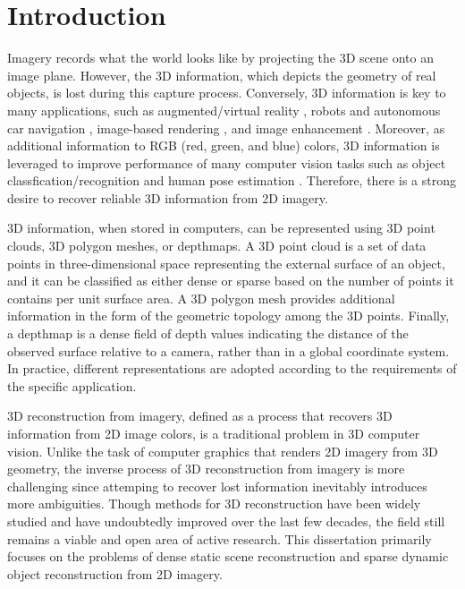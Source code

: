 

\chapter{Introduction}

Imagery records what the world looks like by projecting the 3D scene onto an image plane. However, the 3D information, which depicts the geometry of real objects, is lost during this capture process. Conversely,   3D information is key to many applications, such as augmented/virtual reality \cite{ventura2008depth}, robots and autonomous car navigation \cite{endres2012evaluation}, image-based rendering \cite{View_interpolation1993}, and image enhancement \cite{zhang2014personal}. Moreover, as additional information to RGB (red, green, and blue) colors, 3D information is leveraged to improve performance of many computer vision tasks such as object classfication/recognition \cite{gupta2013perceptual}  and human pose estimation \cite{CVPR_kinect}. Therefore, there is a strong desire to recover reliable 3D information from 2D imagery.

3D information, when stored in computers, can be represented using 3D point clouds, 3D polygon meshes, or depthmaps. A 3D point cloud is a set of data points in three-dimensional space representing the external surface of an object, and it can be classified as either dense or sparse based on the number of points it contains per unit surface area. A 3D polygon mesh provides additional information in the form of the geometric topology among the 3D points. Finally, a depthmap is a dense field of depth values indicating the distance of the observed surface relative to a camera, rather than in a global coordinate system. In practice, different representations are adopted according to the requirements of the specific application. 

3D reconstruction from imagery, defined as a process that recovers 3D information from 2D image colors, is a traditional problem in 3D computer vision. Unlike the task of computer graphics that renders 2D imagery from 3D geometry, the inverse process of 3D reconstruction from imagery is more challenging since attemping to recover lost information inevitably introduces more ambiguities. Though methods for 3D reconstruction have been widely studied and have undoubtedly improved over the last few decades, the field still remains a viable and open area of active research. This dissertation primarily focuses on the problems of dense static scene reconstruction and sparse dynamic object reconstruction from 2D imagery.

